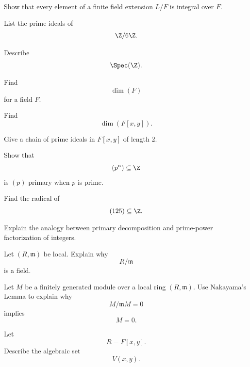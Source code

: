\begin{exercise}[2]
Show that every element of a finite field extension \(L/F\) is integral over
\(F\).
\end{exercise}

\begin{exercise}[1]
List the prime ideals of
\[ \Z/6\Z. \]
\end{exercise}

\begin{exercise}[1]
Describe
\[ \Spec(\Z). \]
\end{exercise}

\begin{exercise}[1]
Find
\[ \dim(F) \]
for a field \(F\).
\end{exercise}

\begin{exercise}[1]
Find
\[ \dim(F[x,y]). \]
\end{exercise}

\begin{exercise}[2]
Give a chain of prime ideals in \(F[x,y]\) of length \(2\).
\end{exercise}

\begin{exercise}[2]
Show that
\[ (p^n)\subseteq\Z \]
is \((p)\)-primary when \(p\) is prime.
\end{exercise}

\begin{exercise}[2]
Find the radical of
\[ (125)\subseteq\Z. \]
\end{exercise}

\begin{exercise}[2]
Explain the analogy between primary decomposition and prime-power
factorization of integers.
\end{exercise}

\begin{exercise}[2]
Let \((R,\mathfrak m)\) be local. Explain why
\[ R/\mathfrak m \]
is a field.
\end{exercise}

\begin{exercise}[3]
Let \(M\) be a finitely generated module over a local ring
\((R,\mathfrak m)\). Use Nakayama's Lemma to explain why
\[ M/\mathfrak mM=0 \]
implies
\[ M=0. \]
\end{exercise}

\begin{exercise}[2]
Let
\[ R=F[x,y]. \]
Describe the algebraic set
\[ V(x,y). \]
\end{exercise}

